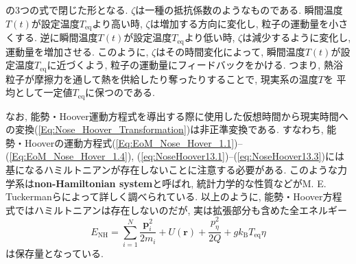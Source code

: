 の3つの式で閉じた形となる.
$\zeta$は一種の抵抗係数のようなものである.
瞬間温度$T(t)$が設定温度$T_{\mathrm{eq}}$より高い時, $\zeta$は増加する方向に変化し, 粒子の運動量を小さくする.
逆に瞬間温度$T(t)$が設定温度$T_{\mathrm{eq}}$より低い時, $\zeta$は減少するように変化し, 運動量を増加させる.
このように, $\zeta$はその時間変化によって, 瞬間温度$T(t)$が設定温度$T_{\mathrm{eq}}$に近づくよう, 粒子の運動量にフィードバックをかける.
つまり, 熱浴粒子が摩擦力を通して熱を供給したり奪ったりすることで, 現実系の温度$T$を
平均として一定値$T_{\mathrm{eq}}$に保つのである.

なお, 能勢・Hoover運動方程式を導出する際に使用した仮想時間から現実時間への変換(\ref{Eq:Nose_Hoover_Transformation})は非正準変換である. すなわち, 能勢・Hooverの運動方程式(\ref{Eq:EoM_Nose_Hover_1.1})--(\ref{Eq:EoM_Nose_Hover_1.4}), (\ref{eq:NoseHoover13.1})--(\ref{eq:NoseHoover13.3})には基になるハミルトニアンが存在しないことに注意する必要がある. このような力学系は\textbf{non-Hamiltonian system}と呼ばれ, 統計力学的な性質などがM. E. Tuckermanらによって詳しく調べられている\cite{Tuckerman2001, Tuckerman2010}.
以上のように, 能勢・Hoover方程式ではハミルトニアンは存在しないのだが, 実は拡張部分も含めた全エネルギー
\begin{equation}
  E_{\mathrm{NH}}
  =
  \sum_{i=1}^{N} \frac{\bm{p}_{i}^{2}}{2m_{i}}
  +
  U(\bm{r})
  +
  \frac{p_{\eta}^{2}}{2Q}
  +
  g k_{\mathrm{B}} T_{\mathrm{eq}} \eta
\end{equation}
は保存量となっている.


